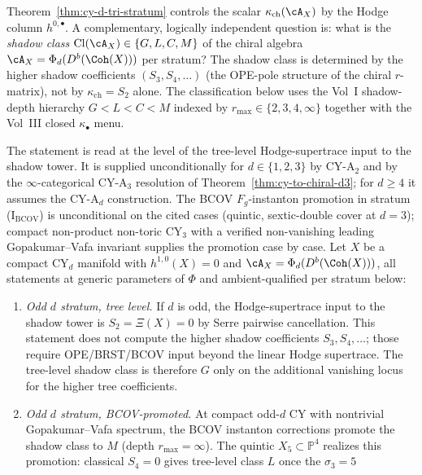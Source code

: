 Theorem~\ref{thm:cy-d-tri-stratum} controls the scalar $\kappa_{\mathrm{ch}}(\cA_X)$
by the Hodge column $h^{0, \bullet}$. A complementary, logically
independent question is: what is the \emph{shadow class}
$\mathrm{Cl}(\cA_X) \in \{G, L, C, M\}$ of the chiral algebra
$\cA_X = \Phi_d(D^b(\Coh(X)))$ per stratum? The shadow class is
determined by the higher shadow coefficients $(S_3, S_4, \ldots)$
(the OPE-pole structure of the chiral $r$-matrix), not by $\kappa_{\mathrm{ch}} = S_2$
alone. The classification below uses the Vol~I shadow-depth
hierarchy $G < L < C < M$ indexed by $r_{\max} \in \{2, 3, 4, \infty\}$
together with the Vol~III closed $\kappa_\bullet$ menu.

\begin{theorem}
\label{thm:cy-d-shadow-class-stratification}
The statement is read at the level of the tree-level Hodge-supertrace
input to the shadow tower. It is supplied unconditionally for
$d \in \{1, 2, 3\}$ by CY-A$_2$ and by the $\infty$-categorical
CY-A$_3$ resolution of Theorem~\ref{thm:cy-to-chiral-d3}; for
$d \geq 4$ it assumes the CY-A$_d$ construction. The BCOV
$F_g$-instanton promotion in stratum (I$_{\mathrm{BCOV}}$) is
unconditional on the cited cases (quintic, sextic-double cover at
$d = 3$); compact non-product non-toric CY$_3$ with a verified
non-vanishing leading Gopakumar--Vafa invariant supplies the
promotion case by case.
Let $X$ be a compact CY$_d$ manifold with $h^{1, 0}(X) = 0$ and
$\cA_X = \Phi_d(D^b(\Coh(X)))$, all statements at generic parameters of
$\Phi$ and ambient-qualified per stratum below:
\begin{enumerate}
 \item[\textup{(I$_{\mathrm{tree}}$)}] \emph{Odd $d$ stratum, tree level.}
 If $d$ is odd, the Hodge-supertrace input to the shadow tower is
 $S_2=\Xi(X)=0$ by Serre pairwise cancellation.  This statement does
 not compute the higher shadow coefficients $S_3,S_4,\ldots$; those
 require OPE/BRST/BCOV input beyond the linear Hodge supertrace.  The
 tree-level shadow class is therefore $G$ only on the additional
 vanishing locus for the higher tree coefficients.
 \item[\textup{(I$_{\mathrm{BCOV}}$)}] \emph{Odd $d$ stratum, BCOV-promoted.}
 At compact odd-$d$ CY with nontrivial Gopakumar--Vafa spectrum, the
 BCOV instanton corrections promote the shadow class to $M$
 \textup{(}depth $r_{\max} = \infty$\textup{)}. The quintic
 $X_5 \subset \mathbb{P}^4$ realizes this promotion: classical
 $S_4 = 0$ gives tree-level class $L$ once the $\sigma_3 = 5$

\end{enumerate}
\end{theorem}
